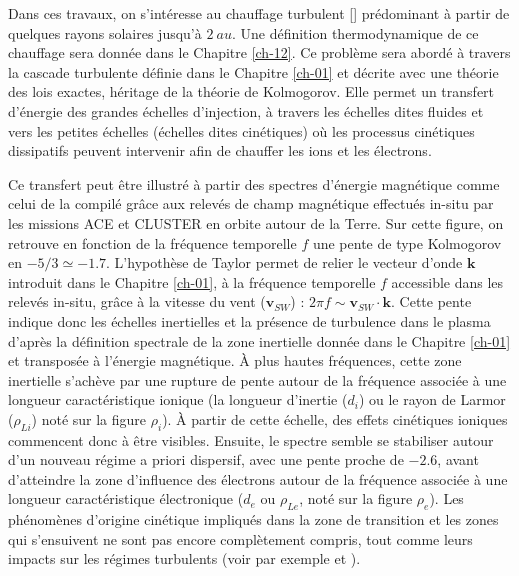 Dans ces travaux, on s'intéresse au chauffage turbulent [\cite{tu_mhd_1995,kiyani_dissipation_2015}] prédominant à partir de quelques rayons solaires jusqu'à $\SI{2}{au}$. Une définition thermodynamique de ce chauffage sera donnée dans le Chapitre \ref{ch-12}. Ce problème sera abordé à travers la cascade turbulente définie dans le Chapitre \ref{ch-01} et décrite avec une théorie des lois exactes, héritage de la théorie de Kolmogorov. Elle permet un transfert d'énergie des grandes échelles d'injection, à travers les échelles dites fluides et vers les petites échelles (échelles dites cinétiques) où les processus cinétiques dissipatifs peuvent intervenir afin de chauffer les ions et les électrons. 

Ce transfert peut être illustré à partir des spectres d'énergie magnétique comme celui de la  compilé grâce aux relevés de champ magnétique effectués in-situ par les missions \ac{ACE} et \acs{CLUSTER} en orbite autour de la Terre.  Sur cette figure, on retrouve en fonction de la fréquence temporelle $f$ une pente de type Kolmogorov en $-5/3 \simeq -1.7$. L'hypothèse de Taylor permet de relier le vecteur d'onde $\boldsymbol{k}$ introduit dans le Chapitre \ref{ch-01}, à la fréquence temporelle $f$ accessible dans les relevés in-situ, grâce à la vitesse du vent ($\boldsymbol{v}_{SW}$) : $2 \pi f \sim \boldsymbol{v}_{SW} \cdot \boldsymbol{k}$.
Cette pente indique donc les échelles inertielles et la présence de turbulence dans le plasma d'après la définition spectrale de la zone inertielle donnée dans le Chapitre \ref{ch-01} et transposée à l'énergie magnétique. 
À plus hautes fréquences, cette zone inertielle s'achève par une rupture de pente autour de la fréquence associée à une longueur caractéristique ionique (la longueur d'inertie ($d_i$) ou le rayon de Larmor ($\rho_{Li}$) noté sur la figure $\rho_i$). 
À partir de cette échelle, des effets cinétiques ioniques commencent donc à être visibles. Ensuite, le spectre semble se stabiliser autour d'un nouveau régime a priori dispersif, avec une pente proche de $-2.6$, avant d'atteindre la zone d'influence des électrons autour de la fréquence associée à une longueur caractéristique électronique ($d_e$ ou $\rho_{Le}$, noté sur la figure $\rho_e$). Les phénomènes d'origine cinétique impliqués dans la zone de transition et les zones qui s'ensuivent ne sont pas encore complètement compris, tout comme leurs impacts sur les régimes turbulents (voir par exemple \cite{alexandrova_solar_2013} et \cite{sahraoui_magnetohydrodynamic_2020}). 
